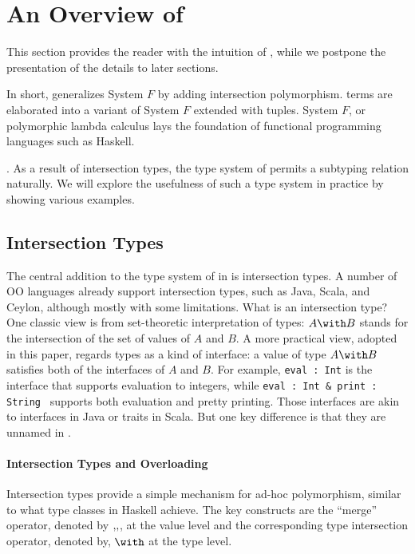 \section{An Overview of \name}


This section provides the reader with the intuition of \name, while we
postpone the presentation of the details to later sections.

In short, \name generalizes System $ F $ by adding intersection polymorphism.
\name terms are elaborated into a variant of System $ F $ extended with tuples.
System $ F $, or polymorphic lambda calculus lays the foundation of functional
programming languages such as Haskell.

. As a result of intersection
types, the type system of \name permits a subtyping relation naturally. We will
explore the usefulness of such a type system in practice by showing various
examples.

\subsection{Intersection Types}

The central addition to the type system of \target in \name is intersection
types.  A number of OO languages already support
intersection types, such as Java, Scala, and Ceylon, although mostly with some
limitations. What is an intersection type? One classic view is from
set-theoretic interpretation of types: $ A \intersects B $ stands for the
intersection of the set of values of $ A $ and $ B $. A more practical view,
adopted in this paper, regards types as a kind of interface: a value of type
$ A \intersects B $ satisfies both of the interfaces of $ A $ and $ B $. For
example, \lstinline{eval : Int} is the interface that supports evaluation to
integers, while \lstinline{eval : Int & print : String } supports both
evaluation and pretty printing. Those interfaces are akin to interfaces in Java
or traits in Scala. But one key difference is that they are unnamed in \name.

\paragraph{Intersection Types and Overloading}
Intersection types provide a simple mechanism for ad-hoc polymorphism, similar
to what type classes in Haskell achieve. The key constructs are the ``merge''
operator, denoted by $ ,\!, $, at the value level and the corresponding type
intersection operator, denoted by, $ \intersects $ at the type
level.

